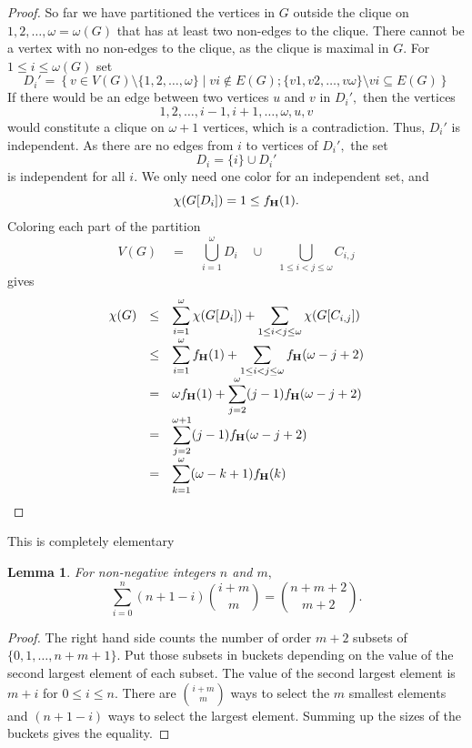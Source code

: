 \documentclass{article}
\theoremstyle{plain}
\newtheorem{lem}[thm]{Lemma}
\theoremstyle{definition}
\begin{document}
\begin{proof}
So far we have partitioned the vertices in $G$ outside the clique on $1,2,\ldots, \omega=\omega(G)$  that has at least two non-edges to the clique. There cannot be a vertex with no non-edges to the clique, as the clique is maximal in $G.$ 
For $1\leq i \leq \omega(G)$ set
\[ D_i'
= \left\{ v\in V(G) \setminus \{1,2,\ldots, \omega\} \mid vi \not\in E(G); \{v1,v2, \ldots, v\omega \} \setminus vi \subseteq E(G) 
 \right \}
\]
If there would be an edge between two vertices $u$ and $v$ in $D_i',$ then the vertices
\[ 1,2, \ldots, i-1, i+1, \ldots, \omega, u, v \]
would constitute a clique on $\omega+1$ vertices, which is a contradiction. Thus, $D_i'$ is independent. As there are no edges from $i$ to vertices of $D_i',$ the set
\[ D_i = \{i\} \cup D_i' \]
is independent for all $i.$ We only need one color for an independent set, and
\[ \chi(G[D_i]) = 1 \leq  f_{{\bf H  } }( 1). \]
Coloring each part of the partition
\[ V(G) \quad = \quad   \bigcup_{i=1}^\omega D_{i}      \quad \cup \quad    \bigcup_{1\leq i < j \leq \omega}  C_{i,j}  \]
gives
\[\begin{array}{rcl} 
\chi(G) & \leq & \displaystyle  \sum_{i=1} ^\omega \chi(G[D_i]) +  \sum_{1\leq i < j \leq \omega}  \chi(G[C_{i,j}]) \\
& \leq & \displaystyle  \sum_{i=1} ^\omega  f_{{\bf H  } }( 1) +  \sum_{1\leq i < j \leq \omega}   f_{{\bf H  } }( \omega-j+2 ) \\
& = & \displaystyle  \omega  f_{{\bf H  } }( 1) +  \sum_{j=2}^\omega   (j-1)f_{{\bf H  } }( \omega-j+2 ) \\
& = & \displaystyle  \sum_{j=2}^{\omega+1}   (j-1)f_{{\bf H  } }( \omega-j+2 ) \\
& = & \displaystyle \sum_{k=1}^{\omega}  (\omega-k+1)  f_{{\bf H  } }(k)
\end{array}
\]
\end{proof}

This is completely elementary 
\begin{lem}\label{doubleBumpLemma}
For non-negative integers $n$ and $m,$
\[ 
\sum_{i=0}^n   (n+1-i)    {i + m   \choose m } =  {n + m+2   \choose m+2}.
\]
\end{lem}
\begin{proof} The right hand side counts the number of order $m+2$ subsets of $\{0,1,\ldots,n+m+1\}.$ Put those subsets in buckets depending on the value of the second largest element of each subset. The value of the second largest element is $m+i$ for $0\leq i \leq n.$ There are $ {i + m   \choose m } $ ways to select the $m$ smallest elements and $ (n+1-i) $ ways to select the largest element. Summing up the sizes of the buckets gives the equality.
\end{proof}
\end{document}
